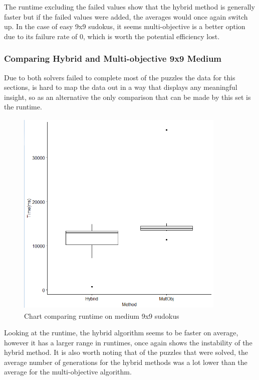 \documentclass[a4paper,11pt]{article}
\begin{document}
The runtime excluding the failed values show that the hybrid method is generally faster but if the failed values were added, the averages would once again switch up. In the case of easy 9x9 sudokus, it seems multi-objective is a better option due to its failure rate of 0, which is worth the potential efficiency lost.
\subsubsection{Comparing Hybrid and Multi-objective 9x9 Medium}

Due to both solvers failed to complete most of the puzzles the data for this sections, is hard to map the data out in a way that displays any meaningful insight, so as an alternative the only comparison that can be made by this set is the runtime.
\begin{figure}[h]
	\centering
	\includegraphics[height=10cm,width=10cm]{./Diagrams/barChartTime9x9Medium}
	\caption{Chart comparing runtime on medium 9x9 sudokus}
\end{figure}
Looking at the runtime, the hybrid algorithm seems to be faster on average, however it has a larger range in runtimes, once again shows the instability of the hybrid method. It is also worth noting that of the puzzles that were solved, the average number of generations for the hybrid methods was a lot lower than the average for the multi-objective algorithm.
\end{document}

